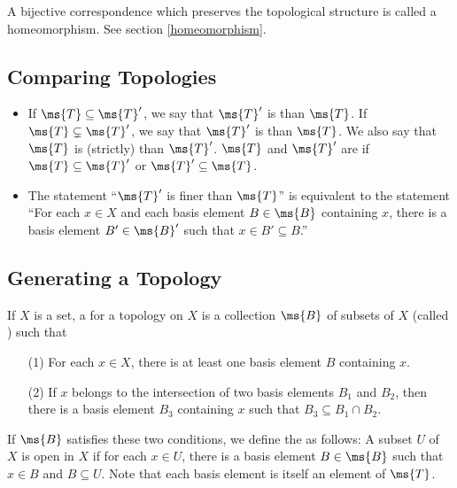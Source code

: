 A bijective correspondence which preserves the topological 
structure is called a homeomorphism. See section 
\ref{homeomorphism}.


\subsection{Comparing Topologies}

\begin{itemize}
	\item If $\ms{T} \subseteq \ms{T}'$, we say that $\ms{T}'$ is 
	 than $\ms{T}$. If $\ms{T} 
	\subsetneq \ms{T}'$, we say that $\ms{T}'$ is  than $\ms{T}$. We also say that $\ms{T}$ is (strictly) 
	 than $\ms{T}'$. $\ms{T}$ 
	and $\ms{T}'$ are  
	if $\ms{T} \subseteq \ms{T}'$ or $\ms{T}' \subseteq \ms{T}$.
	
	\item The statement ``$\ms{T}'$ is finer than $\ms{T}$'' is 
	equivalent to the statement ``For each $x \in X$ and each 
	basis element $B \in \ms{B}$ containing $x$, there is a basis 
	element $B' \in \ms{B}'$ such that $x \in B' \subseteq B$.''
\end{itemize}


\subsection{Generating a Topology}

\begin{definition}\label{basis top}
	If $X$ is a set, a  for 
	a topology on $X$ is a collection $\ms{B}$ of subsets of $X$ 
	(called ) such that
	\begin{enumerate}
		\item[(1)] For each $x \in X$, there is at least one 
		basis element $B$ containing $x$.
		
		\item[(2)] If $x$ belongs to the intersection of two 
		basis elements $B_1$ and $B_2$, then there is a basis 
		element $B_3$ containing $x$ such that $B_3 \subseteq B_1 
		\cap B_2$.
	\end{enumerate}
	If $\ms{B}$ satisfies these two conditions, we define the 
	 as follows: A 
	subset $U$ of $X$ is open in $X$ if for each $x \in U$, there 
	is a basis element $B \in \ms{B}$ such that $x \in B$ and $B 
	\subseteq U$. Note that each basis element is itself an 
	element of $\ms{T}$.
\end{definition}

